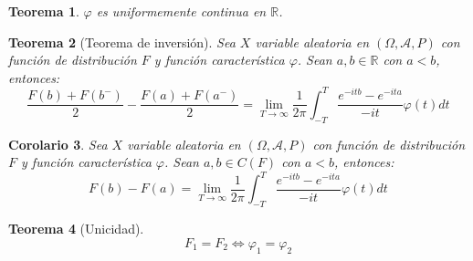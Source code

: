 \documentclass{report}
\newtheorem{theorem}{Teorema}[chapter]
\newtheorem{corollary}[theorem]{Corolario}
\theoremstyle{remark}
\theoremstyle{remark}
\theoremstyle{remark}
\theoremstyle{definition}
\theoremstyle{definition}
\theoremstyle{definition}
\theoremstyle{definition}
\begin{document}
\begin{theorem}
    $\varphi$ es uniformemente continua en $\mathbb{R}$.
\end{theorem}

\begin{theorem}[Teorema de inversión]
    Sea $X$ variable aleatoria en $(\Omega, \mathcal{A}, P)$ con función de distribución $F$ y función característica $\varphi$.
    Sean $a, b \in \mathbb{R}$ con $a < b$, entonces:
    $$\frac{F(b)+F(b^-)}{2} - \frac{F(a)+F(a^-)}{2} = \lim\limits_{T \to \infty} \frac{1}{2\pi} \int_{-T}^T \frac{e^{-itb}-e^{-ita}}{-it} \varphi(t)dt$$
\end{theorem}

\begin{corollary}
    Sea $X$ variable aleatoria en $(\Omega, \mathcal{A}, P)$ con función de distribución $F$ y función característica $\varphi$.
    Sean $a, b \in C(F)$ con $a < b$, entonces:
    $$F(b) - F(a) = \lim\limits_{T \to \infty} \frac{1}{2\pi} \int_{-T}^T \frac{e^{-itb}-e^{-ita}}{-it} \varphi(t)dt$$
\end{corollary}

\begin{theorem}[Unicidad]
    $$F_1 = F_2 \Leftrightarrow \varphi_1 = \varphi_2$$
\end{theorem}
\end{document}
